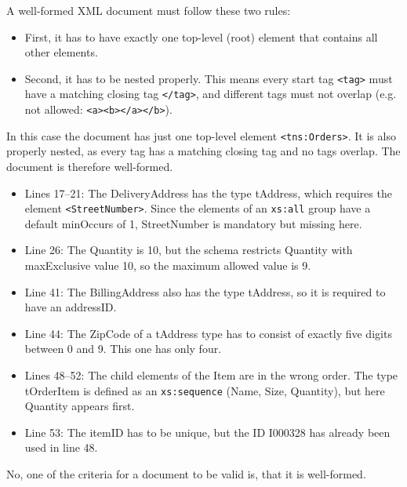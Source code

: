 \documentclass[12pt,ngerman]{scrartcl}
\begin{document}
\subexercise{}
A well-formed XML document must follow these two rules: 
\begin{itemize}
    \item First, it has to have exactly one top-level (root) element that contains all other elements.
    \item Second, it has to be nested properly. This means every start tag \texttt{<tag>} must have a matching closing tag \texttt{</tag>}, and different tags must not overlap (e.g. not allowed: \texttt{<a><b></a></b>}).
\end{itemize}
In this case the document has just one top-level element \texttt{<tns:Orders>}. It is also properly nested, as every tag has a matching closing tag and no tags overlap. The document is therefore well-formed.

\subexercise{}
\begin{itemize}
    \item Lines 17--21: The DeliveryAddress has the type tAddress, which requires the element \texttt{<StreetNumber>}. Since the elements of an \texttt{xs:all} group have a default minOccurs of 1, StreetNumber is mandatory but missing here.
    \item Line 26: The Quantity is 10, but the schema restricts Quantity with maxExclusive value 10, so the maximum allowed value is 9.
    \item Line 41: The BillingAddress also has the type tAddress, so it is required to have an addressID.
    \item Line 44: The ZipCode of a tAddress type has to consist of exactly five digits between 0 and 9. This one has only four.
    \item Lines 48--52: The child elements of the Item are in the wrong order. The type tOrderItem is defined as an \texttt{xs:sequence} (Name, Size, Quantity), but here Quantity appears first.
    \item Line 53: The itemID has to be unique, but the ID I000328 has already been used in line 48.
\end{itemize}

\subexercise{}
    No, one of the criteria for a document to be valid is, that it is well-formed.

\end{document}
